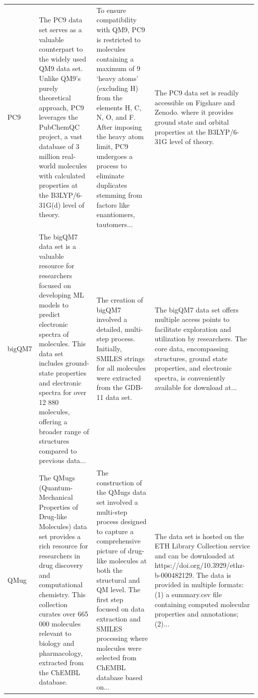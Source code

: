 \documentclass[12pt]{article}
\begin{document}
\begin{longtable}{p{}p{}p{}p{}}
PC9 \cite{ds16-26} & The PC9 data set serves as a valuable counterpart to the widely used QM9 data set. Unlike QM9's purely theoretical approach, PC9 leverages the PubChemQC project, a vast database of 3 million real-world molecules with calculated properties at the B3LYP/6-31G(d) level of theory. & To ensure compatibility with QM9, PC9 is restricted to molecules containing a maximum of 9 `heavy atoms' (excluding H) from the elements H, C, N, O, and F. After imposing the heavy atom limit, PC9 undergoes a process to eliminate duplicates stemming from factors like enantiomers, tautomers... & The PC9 data set is readily accessible on Figshare and Zenodo. where it provides ground state and orbital properties at the B3LYP/6-31G level of theory. \cite{ds16-106,ds16-107} \\
bigQM7 \cite{ds17-1} & The bigQM7 data set is a valuable resource for researchers focused on developing ML models to predict electronic spectra of molecules. This data set includes ground-state properties and electronic spectra for over 12 880 molecules, offering a broader range of structures compared to previous data... & The creation of bigQM7 involved a detailed, multi-step process. Initially, SMILES strings for all molecules were extracted from the GDB-11 data set. & The bigQM7 data set offers multiple access points to facilitate exploration and utilization by researchers. The core data, encompassing structures, ground state properties, and electronic spectra, is conveniently available for download at... \cite{ds17-1} \\
QMug \cite{ds18-41} & The QMugs (Quantum-Mechanical Properties of Drug-like Molecules) data set provides a rich resource for researchers in drug discovery and computational chemistry. This collection curates over 665 000 molecules relevant to biology and pharmacology, extracted from the ChEMBL database. & The construction of the QMugs data set involved a multi-step process designed to capture a comprehensive picture of drug-like molecules at both the structural and QM level. The first step focused on data extraction and SMILES processing where molecules were selected from ChEMBL database based on... & The data set is hosted on the ETH Library Collection service and can be downloaded at https://doi.org/10.3929/ethz-b-000482129. The data is provided in multiple formats: (1) a summary.csv file containing computed molecular properties and annotations; (2)... \cite{ds18-114} \\

\end{longtable}
\end{document}
